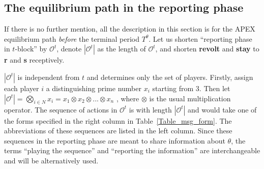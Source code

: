 \documentclass[12pt,letter]{article}
\newcommand{\Omicron}{\mathcal{O}}
\theoremstyle{definition}
\theoremstyle{remark}
\theoremstyle{claim}
\begin{document}




\subsection{The equilibrium path in the reporting phase}
\label{sec:eq_rp}
If there is no further mention, all the description in this section is for the APEX equilibrium path \textit{before} the terminal period $T^{\theta}$. Let us shorten ``reporting phase in $t$-block'' by $\Omicron^{t}$, denote $|\Omicron^t|$ as the length of $\Omicron^{t}$, and shorten \textbf{revolt} and \textbf{stay} to \textbf{r} and \textbf{s} receptively. 

$|\Omicron^{t}|$ is independent from $t$ and determines only the set of players. Firstly, assign each player $i$ a distinguishing prime number $x_i$ starting from $3$. Then let $|\Omicron^{t}|=\bigotimes_{i\in N} x_i=x_1\otimes x_2\otimes...\otimes x_n$ , where $\otimes$ is the usual multiplication operator. The sequence of actions in $\Omicron^{t}$ is with length $|\Omicron^t|$ and would take one of the forms specified in the right column in Table~\ref{Table_msg_form}. The abbreviations of these sequences are listed in the left column. Since these sequences in the reporting phase are meant to share information about $\theta$, the terms ``playing the sequence'' and ``reporting the information'' are interchangeable and will be alternatively used.
\end{document}
